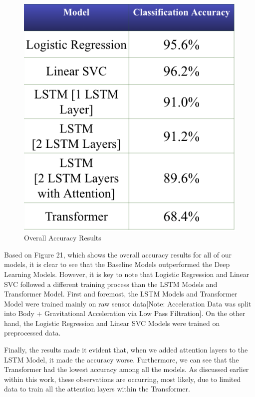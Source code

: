 \documentclass[conference]{IEEEtran}
\begin{document}
\begin{figure}[h!]
    \centering
    \includegraphics[width= 0.9 \linewidth]{results.png}
    \caption{Overall Accuracy Results}
    \label{results.png}
\end{figure}

Based on Figure 21, which shows the overall accuracy results for all of our models, it is clear to see that the Baseline Models outperformed the Deep Learning Models. However, it is key to note that Logistic Regression and Linear SVC followed a different training process than the LSTM Models and Transformer Model. First and foremost, the LSTM Models and Transformer Model were trained mainly on raw sensor data[Note: Acceleration Data was split into Body + Gravitational Acceleration via Low Pass Filtration]. On the other hand, the Logistic Regression and Linear SVC Models were trained on preprocessed data. \newline 

Finally, the results made it evident that, when we added attention layers to the LSTM Model, it made the accuracy worse. Furthermore, we can see that the Transformer had the lowest accuracy among all the models. As discussed earlier within this work, these observations are occurring, most likely, due to limited data to train all the attention layers within the Transformer.
\end{document}
